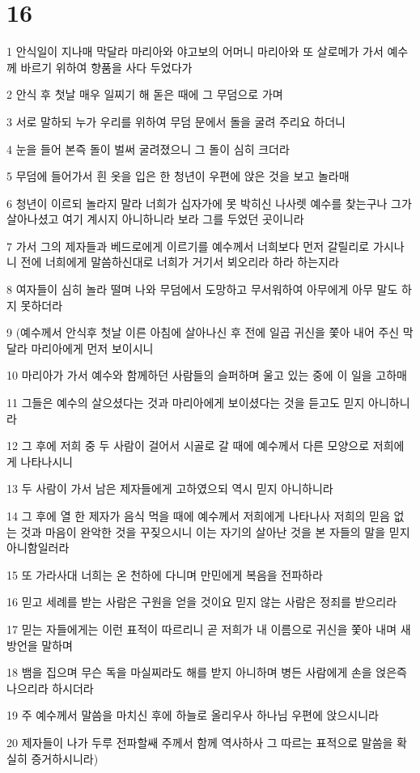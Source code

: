 \chapter{16}

\par 1 안식일이 지나매 막달라 마리아와 야고보의 어머니 마리아와 또 살로메가 가서 예수께 바르기 위하여 향품을 사다 두었다가
\par 2 안식 후 첫날 매우 일찌기 해 돋은 때에 그 무덤으로 가며
\par 3 서로 말하되 누가 우리를 위하여 무덤 문에서 돌을 굴려 주리요 하더니
\par 4 눈을 들어 본즉 돌이 벌써 굴려졌으니 그 돌이 심히 크더라
\par 5 무덤에 들어가서 흰 옷을 입은 한 청년이 우편에 앉은 것을 보고 놀라매
\par 6 청년이 이르되 놀라지 말라 너희가 십자가에 못 박히신 나사렛 예수를 찾는구나 그가 살아나셨고 여기 계시지 아니하니라 보라 그를 두었던 곳이니라
\par 7 가서 그의 제자들과 베드로에게 이르기를 예수께서 너희보다 먼저 갈릴리로 가시나니 전에 너희에게 말씀하신대로 너희가 거기서 뵈오리라 하라 하는지라
\par 8 여자들이 심히 놀라 떨며 나와 무덤에서 도망하고 무서워하여 아무에게 아무 말도 하지 못하더라
\par 9 (예수께서 안식후 첫날 이른 아침에 살아나신 후 전에 일곱 귀신을 쫓아 내어 주신 막달라 마리아에게 먼저 보이시니
\par 10 마리아가 가서 예수와 함께하던 사람들의 슬퍼하며 울고 있는 중에 이 일을 고하매
\par 11 그들은 예수의 살으셨다는 것과 마리아에게 보이셨다는 것을 듣고도 믿지 아니하니라
\par 12 그 후에 저희 중 두 사람이 걸어서 시골로 갈 때에 예수께서 다른 모양으로 저희에게 나타나시니
\par 13 두 사람이 가서 남은 제자들에게 고하였으되 역시 믿지 아니하니라
\par 14 그 후에 열 한 제자가 음식 먹을 때에 예수께서 저희에게 나타나사 저희의 믿음 없는 것과 마음이 완악한 것을 꾸짖으시니 이는 자기의 살아난 것을 본 자들의 말을 믿지 아니함일러라
\par 15 또 가라사대 너희는 온 천하에 다니며 만민에게 복음을 전파하라
\par 16 믿고 세례를 받는 사람은 구원을 얻을 것이요 믿지 않는 사람은 정죄를 받으리라
\par 17 믿는 자들에게는 이런 표적이 따르리니 곧 저희가 내 이름으로 귀신을 쫓아 내며 새 방언을 말하며
\par 18 뱀을 집으며 무슨 독을 마실찌라도 해를 받지 아니하며 병든 사람에게 손을 얹은즉 나으리라 하시더라
\par 19 주 예수께서 말씀을 마치신 후에 하늘로 올리우사 하나님 우편에 앉으시니라
\par 20 제자들이 나가 두루 전파할쌔 주께서 함께 역사하사 그 따르는 표적으로 말씀을 확실히 증거하시니라)



